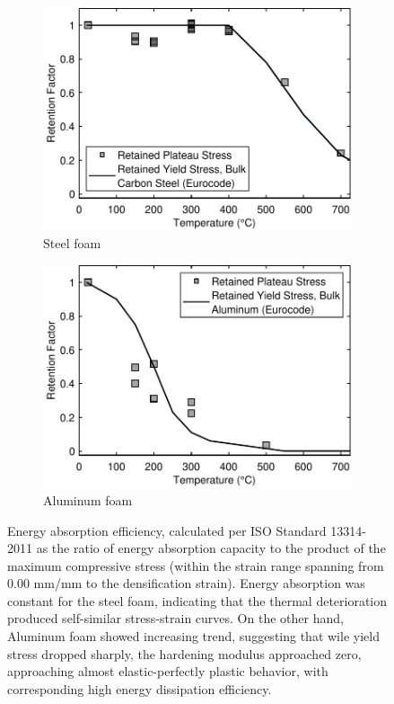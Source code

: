 \documentclass[review]{elsarticle}
\begin{document}
{\begin{figure}
	\centering
	\begin{subfigure}{0.50\textwidth}
		\centering
		\includegraphics[width=0.90\linewidth]
		{Tex-Figures/Fig23a-retentionFactor-Fe.pdf}
		\caption{Steel foam}
		\label{fig:retention_Steel}
	\end{subfigure}%
	\begin{subfigure}{0.50\textwidth}
		\centering
		\includegraphics[width=0.90\linewidth]
		{Tex-Figures/Fig23b-retentionFactor-Al.pdf}
		\caption{Aluminum foam}
		\label{retention_Al}
	\end{subfigure}
	\caption{ Energy absorption efficiency, calculated per ISO Standard 13314-2011 as the ratio of energy absorption capacity to the product of the maximum compressive stress (within the strain range spanning from 0.00 mm/mm to the densification strain). Energy absorption was constant for the steel foam, indicating that the thermal deterioration produced self-similar stress-strain curves. On the other hand, Aluminum foam showed increasing trend, suggesting that wile yield stress dropped sharply, the hardening modulus approached zero, approaching almost elastic-perfectly plastic behavior, with corresponding high energy dissipation efficiency.}
	\label{fig:retention}
\end{figure}

}
\end{document}

